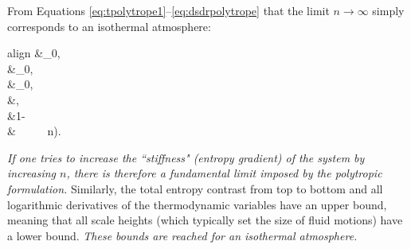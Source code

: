 \documentclass[12pt]{article} %
\begin{document}
From Equations \eqref{eq:tpolytrope1}--\eqref{eq:dsdrpolytrope} that the limit $n\rightarrow\infty$ simply corresponds to an isothermal atmosphere:
	\begin{empheq}[box=\fbox]{align}\label{eq:limitninfty}
\tmpref\ofr&\rightarrow \tmpref_0, \\
\prsref\ofr&\rightarrow \prsref_0,\\
\rhoref\ofr&\rightarrow \rhoref_0,\\
\dsdr &\rightarrow {},\\
 \andd \sref\ofr &\rightarrow {}\bigg{(}1-\bigg{)}\\ 
 &\ \ \ \ \  n\rightarrow\infty). \nonumber
\end{empheq}
\textit{If one tries to increase the ``stiffness" (entropy gradient) of the system by increasing $n$, there is therefore a fundamental limit imposed by the polytropic formulation.}
Similarly, the total entropy contrast from top to bottom and all logarithmic derivatives of the thermodynamic variables have an upper bound, meaning that all scale heights (which typically set the size of fluid motions) have a lower bound. \textit{These bounds are reached for an isothermal atmosphere.}
\end{document}
